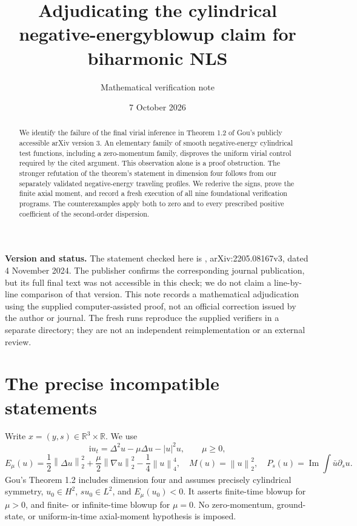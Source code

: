 \documentclass[11pt,a4paper]{article}
\title{Adjudicating the cylindrical negative-energy\newline blowup claim for biharmonic NLS}
\author{Mathematical verification note}
\date{7 October 2026}
\newcommand{\R}{\mathbb R}
\newcommand{\ii}{\mathrm i}
\newcommand{\norm}[1]{\left\|#1\right\|}
\begin{document}
\maketitle
\begin{abstract}
We identify the failure of the final virial inference in Theorem 1.2 of Gou's publicly accessible arXiv version 3. An elementary family of smooth negative-energy cylindrical test functions, including a zero-momentum family, disproves the uniform virial control required by the cited argument. This observation alone is a proof obstruction. The stronger refutation of the theorem's statement in dimension four follows from our separately validated negative-energy traveling profiles. We rederive the signs, prove the finite axial moment, and record a fresh execution of all nine foundational verification programs. The counterexamples apply both to zero and to every prescribed positive coefficient of the second-order dispersion.
\end{abstract}

\noindent\textbf{Version and status.} The statement checked here is \cite[Theorem 1.2]{Gou}, arXiv:2205.08167v3, dated 4 November 2024. The publisher confirms the corresponding journal publication, but its full final text was not accessible in this check; we do not claim a line-by-line comparison of that version. This note records a mathematical adjudication using the supplied computer-assisted proof, not an official correction issued by the author or journal. The fresh runs reproduce the supplied verifiers in a separate directory; they are not an independent reimplementation or an external review.

\section{The precise incompatible statements}
Write $x=(y,s)\in\R^3\times\R$. We use
\begin{equation}\label{pde}
 \ii u_t=\Delta^2u-\mu\Delta u-|u|^2u,\qquad \mu\ge0,
\end{equation}
\[
 E_\mu(u)=\frac12\norm{\Delta u}_2^2+\frac\mu2\norm{\nabla u}_2^2-\frac14\norm u_4^4,
 \quad M(u)=\norm u_2^2,\quad P_s(u)=\operatorname{Im}\int\bar u\partial_su.
\]
Gou's Theorem 1.2 includes dimension four and assumes precisely cylindrical symmetry, $u_0\in H^2$, $su_0\in L^2$, and $E_\mu(u_0)<0$. It asserts finite-time blowup for $\mu>0$, and finite- or infinite-time blowup for $\mu=0$. No zero-momentum, ground-state, or uniform-in-time axial-moment hypothesis is imposed.
\end{document}
